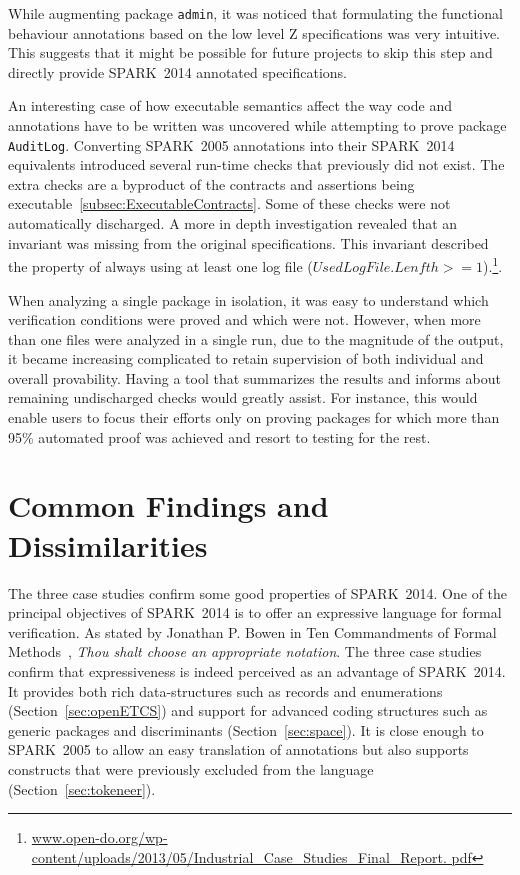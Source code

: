 \documentclass[10pt,a4paper,twocolumn]{article}
\newcommand{\oldspark}{SPARK~2005\xspace}
\newcommand{\newspark}{SPARK~2014\xspace}
\newcommand{\etc}{\textit{etc.}\xspace}
\newcommand{\SPARK}[1]{\lstinline[language=Ada,basicstyle={\footnotesize
      \sffamily},framesep=0pt]$#1$}
\begin{document}
While augmenting package \SPARK{admin}, it was noticed that formulating
the functional behaviour annotations based on the low level Z
specifications was very intuitive. This suggests that it might be
possible for future projects to skip this step and directly provide
\newspark annotated specifications.

An interesting case of how executable semantics affect the way code
and annotations have to be written was uncovered while attempting to
prove package \SPARK{AuditLog}. Converting \oldspark annotations into
their \newspark equivalents introduced several run-time checks that
previously did not exist. The extra checks are a byproduct of the
contracts and assertions being
executable~\ref{subsec:ExecutableContracts}. Some of these checks were
not automatically discharged. A more in depth investigation revealed
that an invariant was missing from the original specifications. This
invariant described the property of always using at least one log file
($UsedLogFile.Lenfth >=
1$).\footnote{\url{
www.open-do.org/wp-content/uploads/2013/05/Industrial_Case_Studies_Final_Report.
pdf}}.

When analyzing a single package in isolation, it was easy to
understand which verification conditions were proved and which were
not. However, when more than one files were analyzed in a single run,
due to the magnitude of the output, it became increasing complicated
to retain supervision of both individual and overall
provability. Having a tool that summarizes the results and informs
about remaining undischarged checks would greatly assist. For
instance, this would enable users to focus their efforts only on
proving packages for which more than 95\% automated proof was
achieved and resort to testing for the rest.

\section{Common Findings and Dissimilarities}

The three case studies confirm some good properties of \newspark.
One of the principal objectives of \newspark is to offer an expressive
language for formal verification. As stated by Jonathan P. Bowen in
Ten Commandments of Formal Methods~\cite{bowen1995ten}, \emph{Thou shalt choose
an appropriate notation}. The three case studies confirm that
expressiveness is indeed perceived as an advantage of \newspark. It provides
both rich data-structures such as records and enumerations
(Section~\ref{sec:openETCS}) and support for advanced coding structures such as
generic packages and discriminants (Section~\ref{sec:space}). It is close enough
to \oldspark to allow an easy translation of annotations but also supports
constructs that were previously excluded from the language
(Section~\ref{sec:tokeneer}).
\end{document}
